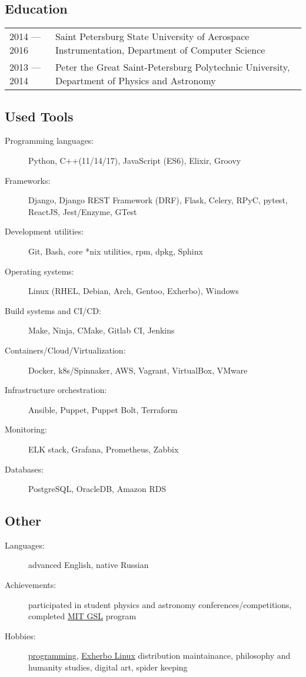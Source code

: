 \documentclass[10pt]{report}
\begin{document}
\subsection*{Education}
\begin{table}[H]
    \begin{tabular}{@{}p{}p{}}
        2014 --- 2016 & Saint Petersburg State University of Aerospace Instrumentation, Department of Computer Science \\
        2013 --- 2014 & Peter the Great Saint-Petersburg Polytechnic University, Department of Physics and Astronomy
    \end{tabular}
\end{table}

\subsection*{Used Tools}
\begin{description}
    \item[Programming languages:]
    Python, C++(11/14/17), JavaScript (ES6), Elixir, Groovy
    \item[Frameworks:]
    Django, Django REST Framework (DRF), Flask, Celery, RPyC, pytest, ReactJS, Jest/Enzyme, GTest
    \item[Development utilities:]
    Git, Bash, core *nix utilities, rpm, dpkg, Sphinx
    \item[Operating systems:]
    Linux (RHEL, Debian, Arch, Gentoo, Exherbo), Windows
    \item[Build systems and CI/CD:]
    Make, Ninja, CMake, Gitlab CI, Jenkins
    \item[Containers/Cloud/Virtualization:]
    Docker, k8s/Spinnaker, AWS, Vagrant, VirtualBox, VMware
    \item[Infrastructure orchestration:]
    Ansible, Puppet, Puppet Bolt, Terraform
    \item[Monitoring:]
    ELK stack, Grafana, Prometheus, Zabbix
    \item[Databases:]
    PostgreSQL, OracleDB, Amazon RDS
\end{description}

\subsection*{Other}
\begin{description}
    \item[Languages:]
    advanced English, native Russian
    \item[Achievements:]
    participated in student physics and astronomy conferences/competitions,
    completed \href{https://gsl.mit.edu/}{MIT GSL} program
    \item[Hobbies:]
    \href{https://github.com/unsip}{programming}, \href{https://exherbo.org/}{Exherbo Linux} distribution maintainance,
        philosophy and humanity studies, digital art, spider keeping
\end{description}
\end{document}
